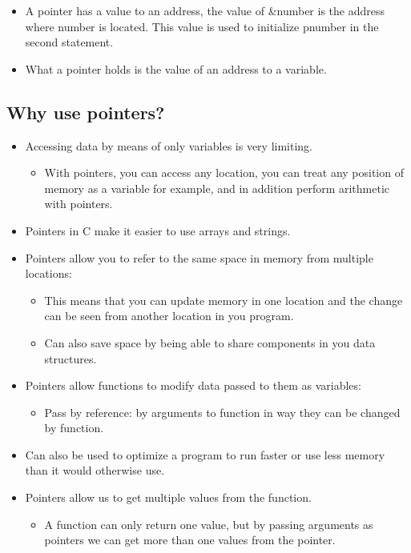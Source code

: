 \begin{itemize}
    \item A pointer has a value to an address, the value of \&number is the address where number is located. This value is used to initialize pnumber in the second statement. 
    \item What a pointer holds is the value of an address to a variable. 
\end{itemize}
\subsection{Why use pointers?}
\begin{itemize}
    \item Accessing data by means of only variables is very limiting.
        \begin{itemize}
            \item With pointers, you can access any location, you can treat any position of memory as a variable for example, and in addition perform arithmetic with pointers.
        \end{itemize}
    
    \item Pointers in C make it easier to use arrays and strings.
    \item Pointers allow you to refer to the same space in memory from multiple locations:
        \begin{itemize}
            \item This means that you can update memory in one location and the change can be seen from another location in you program. 
            \item Can also save space by being able to share components in you data structures. 
        \end{itemize}
    
    \item Pointers allow functions to modify data passed to them as variables: 
        \begin{itemize}
            \item Pass by reference: by arguments to function in way they can be changed by function. 
        \end{itemize}
    
    \item Can also be used to optimize a program to run faster or use less memory than it would otherwise use. 
    \item Pointers allow us to get multiple values from the function.
        \begin{itemize}
            \item A function can only return one value, but by passing arguments as pointers we can get more than one values from the pointer. 
        \end{itemize}
    

\end{itemize}
